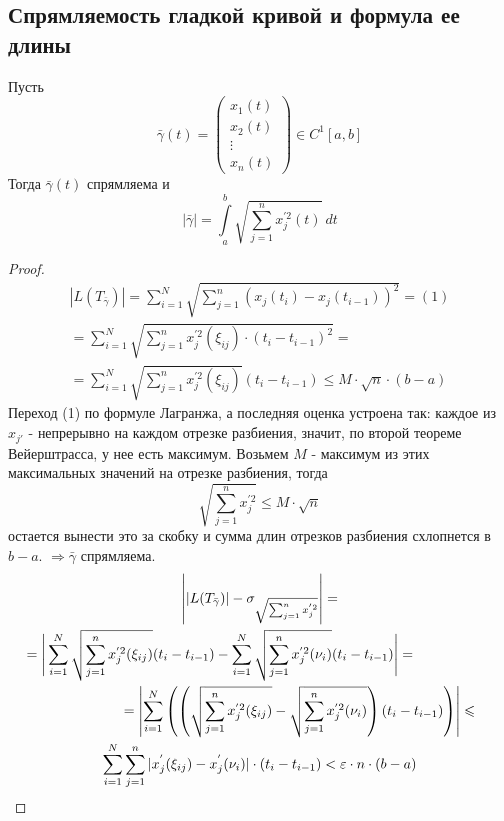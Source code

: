 \subsection{Спрямляемость гладкой кривой и формула ее длины}
\begin{theorem}
    Пусть 
    \[\bar{\gamma}(t) = 
    \begin{pmatrix}
    x_1(t)\\
    x_2(t)\\
    \vdots\\
    x_n(t)
    \end{pmatrix} \in C^1[a,b]\]
    Тогда $\bar{\gamma}(t)$ спрямляема и
    \[|\bar{\gamma}| = \int\limits_{a}^{b} \sqrt{\sum_{j = 1}^{n} x_j^{'2}(t)}\ dt\]
\end{theorem}
\begin{proof}
    \begin{multline*}
        |L(T_{\bar{\gamma}})| = \sum_{i = 1}^{N} \sqrt{ \sum_{j = 1}^{n}(x_j(t_i) - x_j(t_{i - 1}))^2} = (1)\\
        = \sum_{i = 1}^{N} \sqrt{\sum_{j = 1}^{n} x_j^{'2}(\xi_{ij}) \cdot (t_i - t_{i - 1})^2} =\\
        = \sum_{i = 1}^{N} \sqrt{\sum_{j = 1}^{n} x_j^{'2} (\xi_{ij})} (t_i - t_{i - 1}) \leqslant M \cdot \sqrt{n} \cdot (b - a)
    \end{multline*}
    Переход (1) по формуле Лагранжа, а последняя оценка устроена так: каждое из $x_{j'}$ - непрерывно на каждом отрезке разбиения, значит, по второй теореме Вейерштрасса, у нее есть максимум. Возьмем $M$ - максимум из этих максимальных значений на отрезке разбиения, тогда 
    \[\sqrt{\sum\limits_{j=1}^{n}x_j^{'2}}\leq M\cdot \sqrt{n}\]
    остается вынести это за скобку и сумма длин отрезков разбиения схлопнется в $b-a$.
    $\Rightarrow \bar{\gamma}$ спрямляема.
    \newpage
    \begin{multline*}
        \left| |L(T_{\bar{\gamma}})| - \sigma_{\sqrt{\sum_{j = 1}^{n} x_j^{'2}}} \right| =\\
        =\Bigg| \sum_{i = 1}^{N} \sqrt{\sum_{j = 1}^{n} x_j^{'2} (\xi_{ij})}(t_i - t_{i - 1}) - \sum_{i = 1}^{N} \sqrt{\sum_{j = 1}^{n} x_j^{'2} (\nu_{i})}(t_i - t_{i - 1}) \Bigg| =\tab[2cm]\\ 
        \tab[2cm]=\left| \sum_{i=1}^{N} \left( \left( \sqrt{\sum_{j = 1}^{n} x_j^{'2} (\xi_{ij})} - \sqrt{\sum_{j = 1}^{n} x_j^{'2} (\nu_{i})}  \right) (t_i - t_{i - 1}) \right) \right| \leqslant\\
        \sum_{i = 1}^{N} \sum_{j = 1}^{n} |x_j^{'} (\xi_{ij}) - x_j^{'} (\nu_i)| \cdot (t_i - t_{i - 1}) < \epsilon \cdot n \cdot (b - a)

\end{multline*}
\end{proof}
